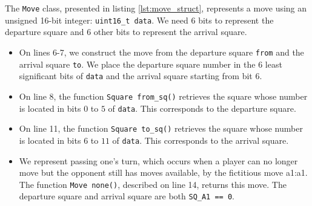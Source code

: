 \documentclass[12pt,a4paper,twoside,openright]{book}
\begin{document}
The \texttt{Move} class, presented in listing \ref{lst:move_struct}, represents a move using an unsigned 16-bit integer: \texttt{uint16_t data}. We need $6$ bits to represent the departure square and $6$ other bits to represent the arrival square.
\begin{itemize}
\item On lines 6-7, we construct the move from the departure square \texttt{from} and the arrival square \texttt{to}. We place the departure square number in the $6$ least significant bits of \texttt{data} and the arrival square starting from bit $6$.

\item On line 8, the function \texttt{Square from_sq()} retrieves the square whose number is located in bits $0$ to $5$ of \texttt{data}. This corresponds to the departure square.

\item On line 11, the function \texttt{Square to_sq()} retrieves the square whose number is located in bits $6$ to $11$ of \texttt{data}. This corresponds to the arrival square.

\item We represent passing one's turn, which occurs when a player can no longer move but the opponent still has moves available, by the fictitious move {\ttfamily a1:a1}. The function \texttt{Move none()}, described on line 14, returns this move. The departure square and arrival square are both \texttt{SQ_A1 == 0}.


\end{itemize}
\end{document}
